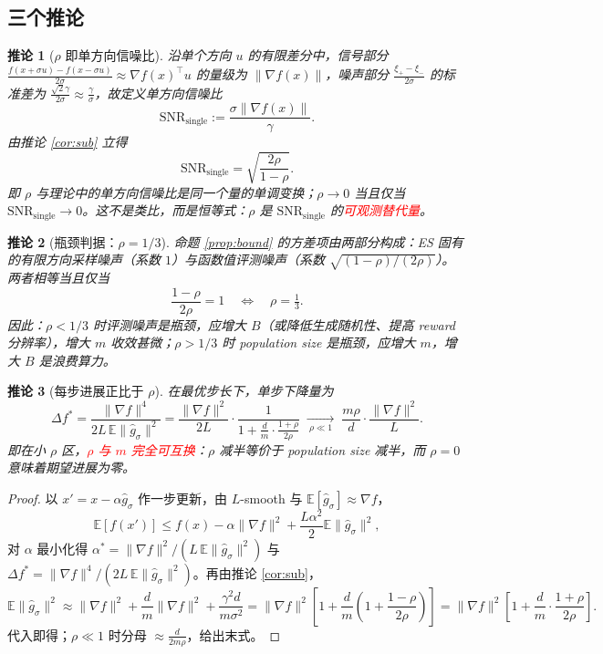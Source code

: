 \documentclass[UTF8]{ctexart}
\newtheorem{corollary}{推论}
\begin{document}
\subsection{三个推论}

\begin{corollary}[$\rho$ 即单方向信噪比]
\label{cor:snr}
沿单个方向 $u$ 的有限差分中，信号部分 $\frac{f(x+\sigma u)-f(x-\sigma u)}{2\sigma}\approx\nabla f(x)^\top u$ 的量级为 $\|\nabla f(x)\|$，噪声部分 $\frac{\xi_+-\xi_-}{2\sigma}$ 的标准差为 $\frac{\sqrt2\gamma}{2\sigma}\approx\frac{\gamma}{\sigma}$，故定义单方向信噪比
\[
\mathrm{SNR}_{\mathrm{single}} := \frac{\sigma\|\nabla f(x)\|}{\gamma}.
\]
由推论 \ref{cor:sub} 立得
\[
\boxed{
\mathrm{SNR}_{\mathrm{single}}
=
\sqrt{\frac{2\rho}{1-\rho}}.
}
\]
即 $\rho$ 与理论中的单方向信噪比是同一个量的单调变换；$\rho\to 0$ 当且仅当 $\mathrm{SNR}_{\mathrm{single}}\to 0$。这不是类比，而是恒等式：$\rho$ 是 $\mathrm{SNR}_{\mathrm{single}}$ 的\textcolor{red}{可观测替代量}。
\end{corollary}

\begin{corollary}[瓶颈判据：$\rho = 1/3$]
\label{cor:third}
命题 \ref{prop:bound} 的方差项由两部分构成：ES 固有的有限方向采样噪声（系数 $1$）与函数值评测噪声（系数 $\sqrt{(1-\rho)/(2\rho)}$）。两者相等当且仅当
\[
\frac{1-\rho}{2\rho} = 1
\quad\Longleftrightarrow\quad
\boxed{\rho = \tfrac13 .}
\]
因此：$\rho < 1/3$ 时评测噪声是瓶颈，应增大 $B$（或降低生成随机性、提高 reward 分辨率），增大 $m$ 收效甚微；$\rho > 1/3$ 时 population size 是瓶颈，应增大 $m$，增大 $B$ 是浪费算力。
\end{corollary}

\begin{corollary}[每步进展正比于 $\rho$]
\label{cor:progress}
在最优步长下，单步下降量为
\[
\Delta f^*
=
\frac{\|\nabla f\|^4}{2L\,\mathbb E\|\widehat g_\sigma\|^2}
=
\frac{\|\nabla f\|^2}{2L}
\cdot
\frac{1}{1 + \frac dm\cdot\frac{1+\rho}{2\rho}}
\;\xrightarrow[\ \rho\ll 1\ ]{}\;
\boxed{\frac{m\rho}{d}\cdot\frac{\|\nabla f\|^2}{L}.}
\]
即在小 $\rho$ 区，\textcolor{red}{$\rho$ 与 $m$ 完全可互换}：$\rho$ 减半等价于 population size 减半，而 $\rho = 0$ 意味着期望进展为零。
\end{corollary}

\begin{proof}
以 $x' = x-\alpha\widehat g_\sigma$ 作一步更新，由 $L$-smooth 与 $\mathbb E[\widehat g_\sigma]\approx\nabla f$，
\[
\mathbb E[f(x')] \leq f(x) - \alpha\|\nabla f\|^2 + \frac{L\alpha^2}{2}\mathbb E\|\widehat g_\sigma\|^2 ,
\]
对 $\alpha$ 最小化得 $\alpha^* = \|\nabla f\|^2/(L\,\mathbb E\|\widehat g_\sigma\|^2)$ 与 $\Delta f^* = \|\nabla f\|^4/(2L\,\mathbb E\|\widehat g_\sigma\|^2)$。再由推论 \ref{cor:sub}，
\[
\mathbb E\|\widehat g_\sigma\|^2
\approx
\|\nabla f\|^2 + \frac dm\|\nabla f\|^2 + \frac{\gamma^2 d}{m\sigma^2}
=
\|\nabla f\|^2\left[1 + \frac dm\left(1 + \frac{1-\rho}{2\rho}\right)\right]
=
\|\nabla f\|^2\left[1 + \frac dm\cdot\frac{1+\rho}{2\rho}\right].
\]
代入即得；$\rho\ll1$ 时分母 $\approx \frac{d}{2m\rho}$，给出末式。
\end{proof}
\end{document}

